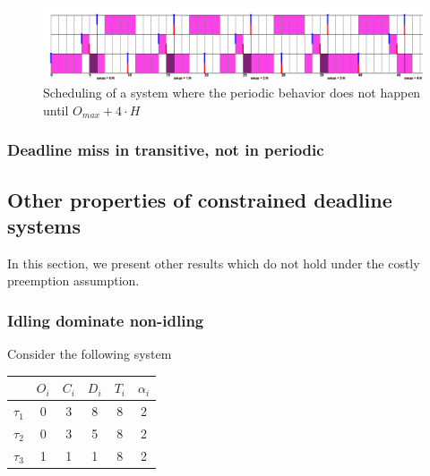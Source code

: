 \documentclass[a4paper,10pt]{article}
\begin{document}
        \begin{figure}[H]
        \begin{center}
            \centerline{\includegraphics[width=1.4\textwidth]{figs/longTransitive2_EDF.png}}
            \caption{Scheduling of a system where the periodic behavior does not happen until $O_{max} + 4 \cdot H$}
            \label{fig:edf_longtransitive}
        \end{center}
        \end{figure}

        \subsubsection{Deadline miss in transitive, not in periodic}

    \subsection{Other properties of constrained deadline systems}

    In this section, we present other results which do not hold under the costly preemption assumption.

        \subsubsection{Idling dominate non-idling}

        Consider the following system

        \begin{center}
            \begin{tabular}{|r|c|c|c|c|c|}
                \hline
                            & $O_i$ & $C_i$ & $D_i$ & $T_i$ & $\alpha_i$ \\ \hline
                $\tau_1$    & 0     & 3     & 8    & 8     & 2     \\ \hline
                $\tau_2$    & 0     & 3     & 5    & 8     & 2     \\ \hline
                $\tau_3$    & 1     & 1     & 1    & 8     & 2     \\ \hline
            \end{tabular}
        \end{center}
\end{document}
